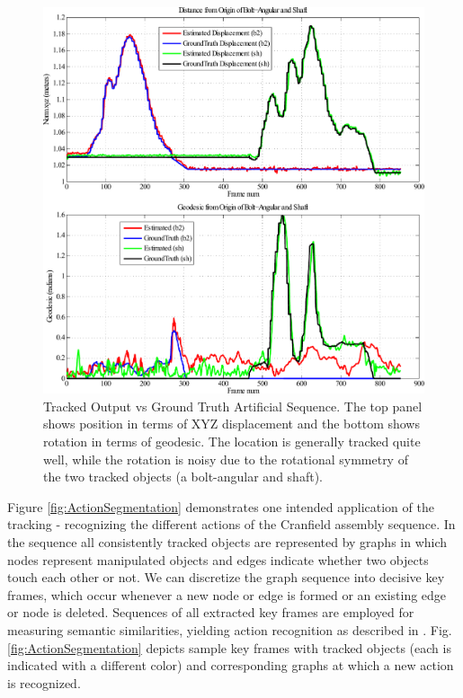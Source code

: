 \begin{figure}[!ht]
  \centering
  \includegraphics[width=\linewidth]{figures/Tracking/CombinedNoNoise.pdf}
  \caption[Tracked Output vs Ground Truth Artificial Sequence]{Tracked Output vs Ground Truth Artificial Sequence. The top panel shows position in terms of XYZ displacement and the bottom shows rotation in terms of geodesic. The location is generally tracked quite well, while the rotation is noisy due to the rotational symmetry of the two tracked objects (a bolt-angular and shaft).}
  \label{fig:CombinedNoNoise}
\end{figure}

Figure \ref{fig:ActionSegmentation} demonstrates one intended application of the tracking - recognizing the different actions of the Cranfield assembly sequence. In the sequence all consistently tracked objects are represented by graphs in which nodes represent manipulated objects and edges indicate whether two objects touch each other or not. We can discretize the graph sequence into decisive key frames, which occur whenever a new node or edge is formed or an existing edge or node is deleted. Sequences of all extracted key frames are employed for measuring semantic similarities, yielding action recognition as described in \cite{Aksoy2010,Aksoy2011}. Fig. \ref{fig:ActionSegmentation} depicts sample key frames with tracked objects (each is indicated with a different color) and corresponding graphs at which a new action is recognized. 

